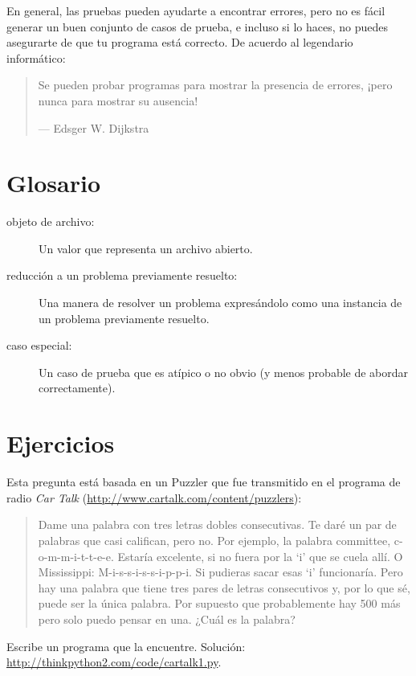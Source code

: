 \documentclass[10pt]{book}
\begin{document}
En general, las pruebas pueden ayudarte a encontrar errores, pero no es fácil
generar un buen conjunto de casos de prueba, e incluso si lo haces, no puedes
asegurarte de que tu programa está correcto.
De acuerdo al legendario informático:

\begin{quote}
Se pueden probar programas para mostrar la presencia de errores, ¡pero nunca para
mostrar su ausencia!

--- Edsger W. Dijkstra
\end{quote}


\section{Glosario}

\begin{description}

\item[objeto de archivo:] Un valor que representa un archivo abierto.

\item[reducción a un problema previamente resuelto:] Una manera de resolver un
  problema expresándolo como una instancia de un problema previamente
  resuelto.  

\item[caso especial:] Un caso de prueba que es atípico o no obvio
(y menos probable de abordar correctamente).

\end{description}


\section{Ejercicios}

\begin{exercise}

Esta pregunta está basada en un Puzzler que fue transmitido en el programa
de radio {\em Car Talk}
(\url{http://www.cartalk.com/content/puzzlers}):

\begin{quote}
Dame una palabra con tres letras dobles consecutivas. Te daré un
par de palabras que casi califican, pero no. Por ejemplo, la palabra
committee, c-o-m-m-i-t-t-e-e. Estaría excelente, si no fuera por la `i' que
se cuela allí. O Mississippi: M-i-s-s-i-s-s-i-p-p-i. Si pudieras
sacar esas `i' funcionaría. Pero hay una palabra que tiene tres
pares de letras consecutivos y, por lo que sé, puede ser
la única palabra. Por supuesto que probablemente hay 500 más pero solo puedo
pensar en una. ¿Cuál es la palabra?
\end{quote}

Escribe un programa que la encuentre.
Solución: \url{http://thinkpython2.com/code/cartalk1.py}.

\end{exercise}
\end{document}
